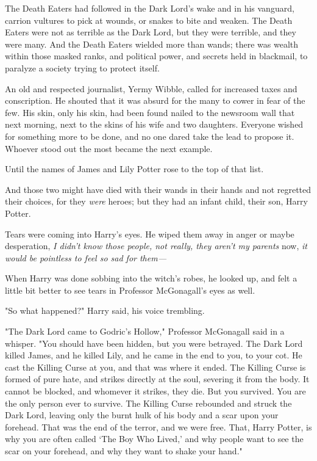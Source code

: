 The Death Eaters had followed in the Dark Lord's wake and in his vanguard,
carrion vultures to pick at wounds, or snakes to bite and weaken. The Death
Eaters were not as terrible as the Dark Lord, but they were terrible, and they
were many. And the Death Eaters wielded more than wands; there was wealth
within those masked ranks, and political power, and secrets held in blackmail,
to paralyze a society trying to protect itself.

An old and respected journalist, Yermy Wibble, called for increased taxes and
conscription. He shouted that it was absurd for the many to cower in fear of
the few. His skin, only his skin, had been found nailed to the newsroom wall
that next morning, next to the skins of his wife and two daughters. Everyone
wished for something more to be done, and no one dared take the lead to propose
it. Whoever stood out the most became the next example.

Until the names of James and Lily Potter rose to the top of that list.

And those two might have died with their wands in their hands and not regretted
their choices, for they \emph{were} heroes; but they had an infant
child, their son, Harry Potter.

Tears were coming into Harry's eyes. He wiped them away in anger or maybe
desperation, \emph{I didn't know those people, not really, they aren't my
parents} now, \emph{it would be pointless to feel so sad for them—}

When Harry was done sobbing into the witch's robes, he looked up, and felt a
little bit better to see tears in Professor McGonagall's eyes as well.

"So what happened?" Harry said, his voice trembling.

"The Dark Lord came to Godric's Hollow," Professor McGonagall said in a
whisper. "You should have been hidden, but you were betrayed. The Dark Lord
killed James, and he killed Lily, and he came in the end to you, to your cot.
He cast the Killing Curse at you, and that was where it ended. The Killing
Curse is formed of pure hate, and strikes directly at the soul, severing it
from the body. It cannot be blocked, and whomever it strikes, they die. But you
survived. You are the only person ever to survive. The Killing Curse rebounded
and struck the Dark Lord, leaving only the burnt hulk of his body and a scar
upon your forehead. That was the end of the terror, and we were free. That,
Harry Potter, is why you are often called `The Boy Who Lived,'
and why people want to see the scar on your forehead, and why they
want to shake your hand."

